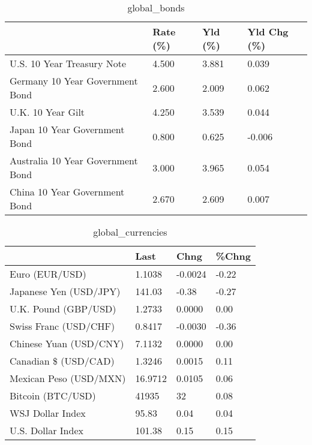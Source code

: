 \documentclass{article}%
\begin{document}
%


\begin{table}[htbp]%
\caption{global\_bonds}%
\centering%
\begin{adjustbox}{width=1\textwidth}%
\begin{tabular}{llll}
\toprule
                                  & Rate (\%) & Yld (\%) & Yld Chg (\%) \\
\midrule
       U.S. 10 Year Treasury Note &    4.500 &   3.881 &       0.039 \\
  Germany 10 Year Government Bond &    2.600 &   2.009 &       0.062 \\
                U.K. 10 Year Gilt &    4.250 &   3.539 &       0.044 \\
    Japan 10 Year Government Bond &    0.800 &   0.625 &      -0.006 \\
Australia 10 Year Government Bond &    3.000 &   3.965 &       0.054 \\
    China 10 Year Government Bond &    2.670 &   2.609 &       0.007 \\
\bottomrule
\end{tabular}
%
\end{adjustbox}%
\end{table}

%


\begin{table}[htbp]%
\caption{global\_currencies}%
\centering%
\begin{adjustbox}{width=1\textwidth}%
\begin{tabular}{llll}
\toprule
                       &    Last &    Chng & \%Chng \\
\midrule
        Euro (EUR/USD) &  1.1038 & -0.0024 & -0.22 \\
Japanese Yen (USD/JPY) &  141.03 &   -0.38 & -0.27 \\
  U.K. Pound (GBP/USD) &  1.2733 &  0.0000 &  0.00 \\
 Swiss Franc (USD/CHF) &  0.8417 & -0.0030 & -0.36 \\
Chinese Yuan (USD/CNY) &  7.1132 &  0.0000 &  0.00 \\
  Canadian \$ (USD/CAD) &  1.3246 &  0.0015 &  0.11 \\
Mexican Peso (USD/MXN) & 16.9712 &  0.0105 &  0.06 \\
     Bitcoin (BTC/USD) &   41935 &      32 &  0.08 \\
      WSJ Dollar Index &   95.83 &    0.04 &  0.04 \\
     U.S. Dollar Index &  101.38 &    0.15 &  0.15 \\
\bottomrule
\end{tabular}
%
\end{adjustbox}%
\end{table}
\end{document}
